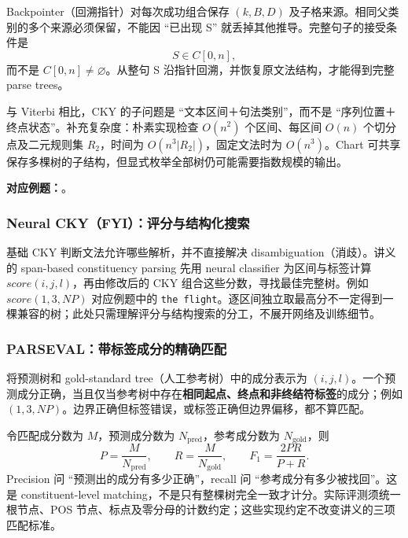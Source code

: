 Backpointer（回溯指针）对每次成功组合保存 $(k,B,D)$ 及子格来源。相同父类别的多个来源必须保留，不能因 ``已出现 S'' 就丢掉其他推导。完整句子的接受条件是
\[
  \boxed{S\in C[0,n]},
\]
而不是 $C[0,n]\ne\varnothing$。从整句 S 沿指针回溯，并恢复原文法结构，才能得到完整 parse trees。

与 Viterbi 相比，CKY 的子问题是 ``文本区间＋句法类别''，而不是 ``序列位置＋终点状态''。补充复杂度：朴素实现检查 $O(n^2)$ 个区间、每区间 $O(n)$ 个切分点及二元规则集 $R_2$，时间为 $O(n^3|R_2|)$，固定文法时为 $O(n^3)$。Chart 可共享保存多棵树的子结构，但显式枚举全部树仍可能需要指数规模的输出。

\textbf{对应例题：}。


\subsubsection{Neural CKY（FYI）：评分与结构化搜索}

基础 CKY 判断文法允许哪些解析，并不直接解决 disambiguation（消歧）。讲义的 span-based constituency parsing 先用 neural classifier 为区间与标签计算 $score(i,j,l)$，再由修改后的 CKY 组合这些分数，寻找最佳完整树。例如 $score(1,3,NP)$ 对应例题中的 \texttt{the flight}。逐区间独立取最高分不一定得到一棵兼容的树；此处只需理解评分与结构搜索的分工，不展开网络及训练细节。

\subsubsection{PARSEVAL：带标签成分的精确匹配}

将预测树和 gold-standard tree（人工参考树）中的成分表示为 $(i,j,l)$。一个预测成分正确，当且仅当参考树中存在\textbf{相同起点、终点和非终结符标签}的成分；例如 $(1,3,NP)$。边界正确但标签错误，或标签正确但边界偏移，都不算匹配。

令匹配成分数为 $M$，预测成分数为 $N_{\mathrm{pred}}$，参考成分数为 $N_{\mathrm{gold}}$，则
\[
  P=\frac{M}{N_{\mathrm{pred}}},\qquad
  R=\frac{M}{N_{\mathrm{gold}}},\qquad
  F_1=\frac{2PR}{P+R}.
\]
Precision 问 ``预测出的成分有多少正确''，recall 问 ``参考成分有多少被找回''。这是 constituent-level matching，不是只有整棵树完全一致才计分。实际评测须统一根节点、POS 节点、标点及零分母的计数约定；这些实现约定不改变讲义的三项匹配标准。


